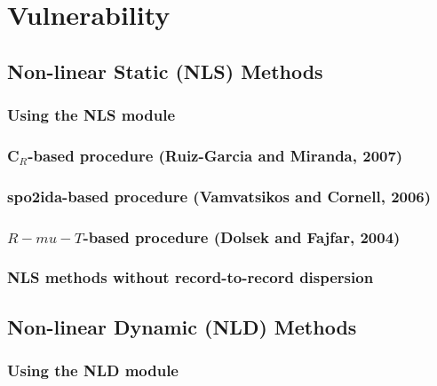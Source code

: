 \chapter{Vulnerability}
\label{chap:vulnerability}


	\section{Non-linear Static (NLS) Methods}
	\label{sec:nls-intro}
	

		\subsection{Using the NLS module}
		\label{subsec:nls-how-to-use}
		

		\subsection{C$_R$-based procedure (Ruiz-Garcia and Miranda, 2007)}
		\label{subsec:nls-ruiz-garcia-miranda}
		

		\subsection{spo2ida-based procedure (Vamvatsikos and Cornell, 2006)}
		\label{subsec:nls-spo2ida}
		

		\subsection{$R-mu-T$-based procedure (Dolsek and Fajfar, 2004)}
		\label{subsec:nls-dolsek-fajfar}
		

		\subsection{NLS methods without record-to-record dispersion}
		\label{subsec:nls-no-dispersion}
		

	\section{Non-linear Dynamic (NLD) Methods}
	\label{sec:nld-intro}
	

		\subsection{Using the NLD module}
		\label{subsec:nld-how-to-use}
		

